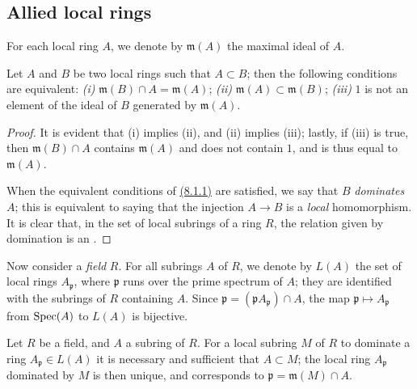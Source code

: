 \subsection{Allied local rings}
\label{subsection-allied-local-rings}

For each local ring $A$, we denote by $\mathfrak{m}(A)$ the maximal ideal of
$A$.

\begin{lem}[8.1.1]
\label{lem-1.8.1.1}
Let $A$ and $B$ be two local rings such that $A\subset B$;
then the following conditions are equivalent: {\it (i)}
$\mathfrak{m}(B)\cap A=\mathfrak{m}(A)$; {\it (ii)}
$\mathfrak{m}(A)\subset\mathfrak{m}(B)$; {\it (iii)} $1$ is not an element of
the ideal of $B$ generated by $\mathfrak{m}(A)$.
\end{lem}

\begin{proof}
\label{proof-lem-1.8.1.1}
It is evident that (i) implies (ii), and (ii) implies (iii); lastly, if (iii) is
true, then $\mathfrak{m}(B)\cap A$ contains $\mathfrak{m}(A)$ and does not
contain $1$, and is thus equal to $\mathfrak{m}(A)$.

When the equivalent conditions of \hyperref[lem-1.8.1.1]{(8.1.1)} are satisfied, we say that $B$
{\it dominates} $A$; this is equivalent to saying that the injection $A\to B$
is a {\it local} homomorphism. It is clear that, in the set of local subrings
of a ring $R$, the relation given by domination is an .
\end{proof}

\begin{env}[8.1.2]
\label{env-1.8.1.2}
Now consider a {\it field} $R$. For all subrings $A$ of
$R$, we denote by $L(A)$ the set of local rings $A_\mathfrak{p}$, where
$\mathfrak{p}$ runs over the prime spectrum of $A$; they are identified with the
subrings of $R$ containing $A$. Since
$\mathfrak{p}=(\mathfrak{p}A_\mathfrak{p})\cap A$, the map
$\mathfrak{p}\mapsto A_\mathfrak{p}$ from ${\mathop{\mathrm{Spec}}\nolimits}(A)$ to $L(A)$ is bijective.
\end{env}

\begin{lem}[8.1.3]
\label{lem-1.8.1.3}
Let $R$ be a field, and $A$ a subring of $R$. For a
local subring $M$ of $R$ to dominate a ring $A_\mathfrak{p}\in L(A)$ it is
necessary and sufficient that $A\subset M$; the local ring $A_\mathfrak{p}$
dominated by $M$ is then unique, and corresponds to
$\mathfrak{p}=\mathfrak{m}(M)\cap A$.
\end{lem}

